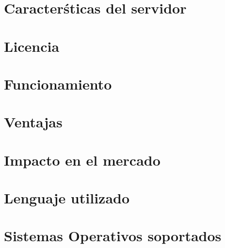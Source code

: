 \section{Caracter\'sticas del servidor}

\section{Licencia}

\section{Funcionamiento}

\section{Ventajas}

\section{Impacto en el mercado}

\section{Lenguaje utilizado}

\section{Sistemas Operativos soportados}

